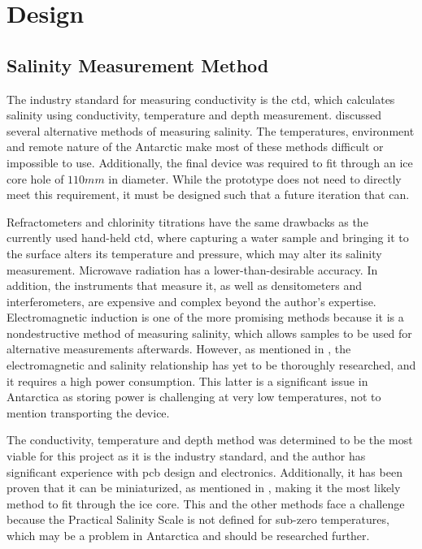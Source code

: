 
\chapter{Design}\label{ch:design}

\section{Salinity Measurement Method}

The industry standard for measuring conductivity is the \gls{ctd}, which calculates salinity using conductivity, temperature and depth measurement.
 discussed several alternative methods of measuring salinity.
The temperatures, environment and remote nature of the Antarctic make most of these methods difficult or impossible to use.
Additionally, the final device was required to fit through an ice core hole of $110mm$ in diameter.
While the prototype does not need to directly meet this requirement, it must be designed such that a future iteration that can.

Refractometers and chlorinity titrations have the same drawbacks as the currently used hand-held \gls{ctd}, where capturing a water sample and bringing it to the surface alters its temperature and pressure, which may alter its salinity measurement.
Microwave radiation has a lower-than-desirable accuracy.
In addition, the instruments that measure it, as well as densitometers and interferometers, are expensive and complex beyond the author's expertise.
Electromagnetic induction is one of the more promising methods because it is a nondestructive method of measuring salinity, which allows samples to be used for alternative measurements afterwards.
However, as mentioned in , the electromagnetic and salinity relationship has yet to be thoroughly researched, and it requires a high power consumption.
This latter is a significant issue in Antarctica as storing power is challenging at very low temperatures, not to mention transporting the device.

The conductivity, temperature and depth method was determined to be the most viable for this project as it is the industry standard, and the author has significant experience with \gls{pcb} design and electronics.
Additionally, it has been proven that it can be miniaturized, as mentioned in , making it the most likely method to fit through the ice core.
This and the other methods face a challenge because the Practical Salinity Scale is not defined for sub-zero temperatures, which may be a problem in Antarctica and should be researched further.

